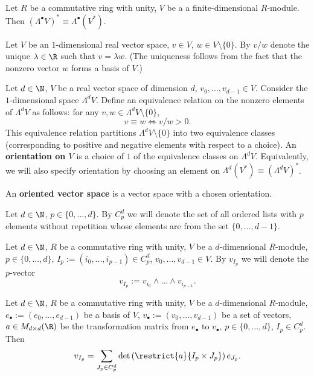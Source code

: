 \begin{corollary}
  Let
    $R$ be a commutative ring with unity,
    $V$ be a a finite-dimensional $R$-module.
  Then $(\Lambda^\bullet V)^* \equiv \Lambda^\bullet (V^*)$.
\end{corollary}
\begin{notation}
  Let
    $V$ be an $1$-dimensional real vector space,
    $v \in V$,
    $w \in V \setminus \{0\}$.
  By $v / w$ denote the unique $\lambda \in \R$ such that $v = \lambda w$.
  (The uniqueness follows from the fact that the nonzero vector $w$ forms a
  basis of $V$.)
\end{notation}
\begin{definition}
  Let
    $d \in \N$,
    $V$ be a real vector space of dimension $d$,
    $v_0, ..., v_{d - 1} \in V$.
  Consider the $1$-dimensional space $\Lambda^d V$.
  Define an equivalence relation on the nonzero elements of $\Lambda^d V$
  as follows: for any $v, w \in \Lambda^d V \setminus \{0\}$,
  \begin{equation}
    v \equiv w \Leftrightarrow v / w > 0.
  \end{equation}
  This equivalence relation partitions $\Lambda^d V \setminus \{0\}$ into two
  equivalence classes
  (corresponding to positive and negative elements with respect to a choice).
  An \textbf{orientation on $V$} is a choice of $1$ of the equivalence classes
  on $\Lambda^d V$.
  Equivalently, we will also specify orientation by choosing an element on
  $\Lambda^d (V^*) \equiv (\Lambda^d V)^*$.

  An \textbf{oriented vector space} is a vector space with a chosen orientation.
\end{definition}
\begin{notation}
  Let
    $d \in \N$,
    $p \in \{0, ..., d\}$.
  By $C^d_p$ we will denote the set of all ordered lists with $p$ elements
  without repetition whose elements are from the set $\{0, ..., d - 1\}$.
\end{notation}
\begin{notation}
  Let
    $d \in \N$,
    $R$ be a commutative ring with unity,
    $V$ be a $d$-dimensional $R$-module,
    $p \in \{0, ..., d\}$,
    $I_p := (i_0, ..., i_{p - 1}) \in C^d_p$,
    $v_0, ..., v_{d - 1} \in V$.
  By $v_{I_p}$ we will denote the $p$-vector
  \begin{equation}
    v_{I_p} := v_{i_0} \wedge ... \wedge v_{i_{p - 1}}.
  \end{equation}
\end{notation}
\begin{proposition}
  Let
    $d \in \N$,
    $R$ be a commutative ring with unity,
    $V$ be a $d$-dimensional $R$-module,
    $e_\bullet := (e_0, ..., e_{d - 1})$ be a basis of $V$,
    $v_\bullet := (v_0, ..., v_{d - 1})$ be a set of vectors,
    $a \in M_{d \times d}(\R)$ be the transformation matrix from
      $e_\bullet$ to $v_\bullet$,
    $p \in \{0, ..., d\}$,
    $I_p \in C^d_p$.
  Then
  \begin{equation}
    v_{I_p} =
    \sum_{J_p \in C^d_p} \det \left(\restrict{a}{I_p \times J_p}\right) e_{J_p}.
  \end{equation}
\end{proposition}
